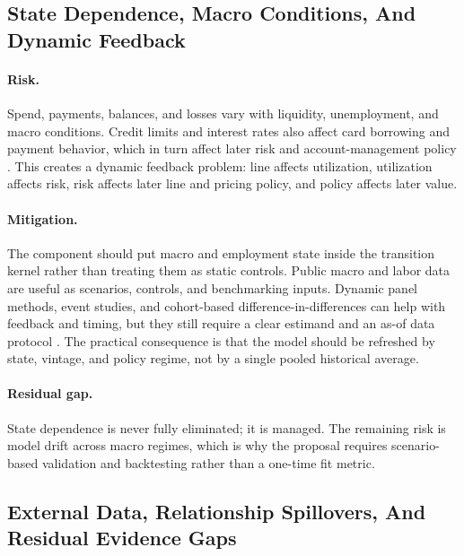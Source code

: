 \documentclass[11pt]{article}
\newcommand{\1}{\mathbf{1}}
\begin{document}
\subsection{State Dependence, Macro Conditions, And Dynamic Feedback}

\paragraph{Risk.}
Spend, payments, balances, and losses vary with liquidity, unemployment, and
macro conditions. Credit limits and interest rates also affect card borrowing
and payment behavior, which in turn affect later risk and account-management
policy \citep{ganong2019unemployment,gross2001liquidity,johnson2004rebates,
baker2020epidemic}. This creates a dynamic feedback problem: line affects
utilization, utilization affects risk, risk affects later line and pricing
policy, and policy affects later value.

\paragraph{Mitigation.}
The component should put macro and employment state inside the transition
kernel rather than treating them as static controls. Public macro and labor
data are useful as scenarios, controls, and benchmarking inputs. Dynamic panel
methods, event studies, and cohort-based difference-in-differences can help
with feedback and timing, but they still require a clear estimand and an as-of
data protocol \citep{arellano1991panel,blundell1998initial,
callaway2021did,sun2021eventstudy}. The practical consequence is that the
model should be refreshed by state, vintage, and policy regime, not by a
single pooled historical average.

\paragraph{Residual gap.}
State dependence is never fully eliminated; it is managed. The remaining risk
is model drift across macro regimes, which is why the proposal requires
scenario-based validation and backtesting rather than a one-time fit metric.

\subsection{External Data, Relationship Spillovers, And Residual Evidence Gaps}
\end{document}

